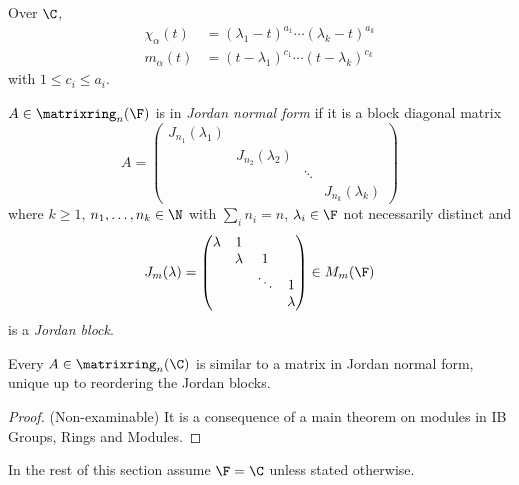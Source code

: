 \documentclass[a4paper]{article}
\newcommand*{\M}{\matrixring}
\theoremstyle{definition}
\begin{document}
\begin{remark}
  Over \(\C\),
  \begin{align*}
    \chi_\alpha(t) &= (\lambda_1 - t)^{a_1} \cdots (\lambda_k - t)^{a_k} \\
    m_\alpha(t) &= (t - \lambda_1)^{c_1} \cdots (t - \lambda_k)^{c_k}
  \end{align*}
  with \(1 \leq c_i \leq a_i\).
\end{remark}

\begin{definition}
  \(A \in \M_n(\F)\) is in \emph{Jordan normal form} if it is a block diagonal matrix
  \[
    A =
    \begin{pmatrix}
      J_{n_1}(\lambda_1) & & & \\
      & J_{n_2}(\lambda_2) & & \\
      & & \ddots & \\
      & & & J_{n_k}(\lambda_k)
    \end{pmatrix}
  \]
  where \(k \geq 1\), \(n_1, \dots, n_k \in \N\) with \(\sum_i n_i = n\), \(\lambda_i \in \F\) not necessarily distinct and
  \[
    J_m(\lambda) =
    \begin{pmatrix}
      \lambda & 1 & & \\
      & \lambda & 1 & \\
      & & \ddots & 1 \\
      & & & \lambda
    \end{pmatrix}
    \in M_m(\F)
  \]
  is a \emph{Jordan block}.
\end{definition}

\begin{theorem}
  \label{thm:jordan normal form}
  Every \(A \in \M_n(\C)\) is similar to a matrix in Jordan normal form, unique up to reordering the Jordan blocks.
\end{theorem}

\begin{proof}(Non-examinable)
  It is a consequence of a main theorem on modules in IB Groups, Rings and Modules.
\end{proof}

In the rest of this section assume \(\F = \C\) unless stated otherwise.
\end{document}
